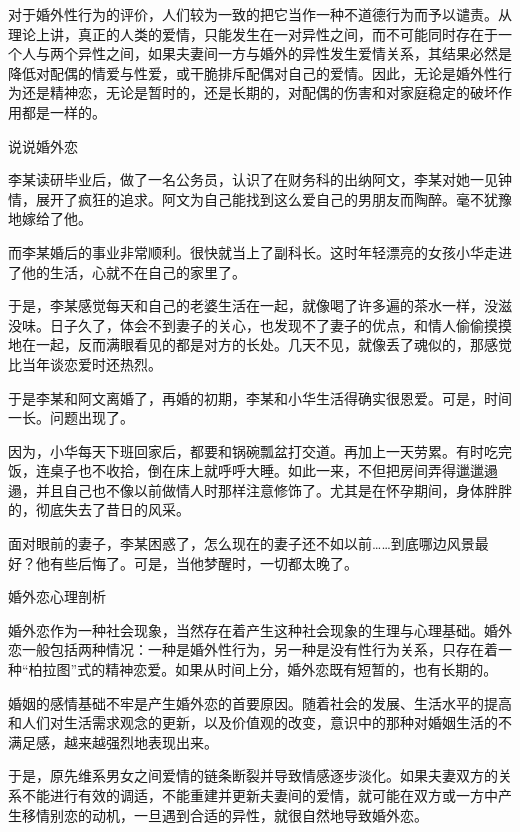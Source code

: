 \documentclass[12pt,UTF8,openany]{ctexbook}
\begin{document}
对于婚外性行为的评价，人们较为一致的把它当作一种不道德行为而予以谴责。从理论上讲，真正的人类的爱情，只能发生在一对异性之间，而不可能同时存在于一个人与两个异性之间，如果夫妻间一方与婚外的异性发生爱情关系，其结果必然是降低对配偶的情爱与性爱，或干脆排斥配偶对自己的爱情。因此，无论是婚外性行为还是精神恋，无论是暂时的，还是长期的，对配偶的伤害和对家庭稳定的破坏作用都是一样的。





说说婚外恋


李某读研毕业后，做了一名公务员，认识了在财务科的出纳阿文，李某对她一见钟情，展开了疯狂的追求。阿文为自己能找到这么爱自己的男朋友而陶醉。毫不犹豫地嫁给了他。

而李某婚后的事业非常顺利。很快就当上了副科长。这时年轻漂亮的女孩小华走进了他的生活，心就不在自己的家里了。

于是，李某感觉每天和自己的老婆生活在一起，就像喝了许多遍的茶水一样，没滋没味。日子久了，体会不到妻子的关心，也发现不了妻子的优点，和情人偷偷摸摸地在一起，反而满眼看见的都是对方的长处。几天不见，就像丢了魂似的，那感觉比当年谈恋爱时还热烈。

于是李某和阿文离婚了，再婚的初期，李某和小华生活得确实很恩爱。可是，时间一长。问题出现了。

因为，小华每天下班回家后，都要和锅碗瓢盆打交道。再加上一天劳累。有时吃完饭，连桌子也不收拾，倒在床上就呼呼大睡。如此一来，不但把房间弄得邋邋遢遢，并且自己也不像以前做情人时那样注意修饰了。尤其是在怀孕期间，身体胖胖的，彻底失去了昔日的风采。

面对眼前的妻子，李某困惑了，怎么现在的妻子还不如以前……到底哪边风景最好？他有些后悔了。可是，当他梦醒时，一切都太晚了。





婚外恋心理剖析


婚外恋作为一种社会现象，当然存在着产生这种社会现象的生理与心理基础。婚外恋一般包括两种情况：一种是婚外性行为，另一种是没有性行为关系，只存在着一种“柏拉图”式的精神恋爱。如果从时间上分，婚外恋既有短暂的，也有长期的。

婚姻的感情基础不牢是产生婚外恋的首要原因。随着社会的发展、生活水平的提高和人们对生活需求观念的更新，以及价值观的改变，意识中的那种对婚姻生活的不满足感，越来越强烈地表现出来。

于是，原先维系男女之间爱情的链条断裂并导致情感逐步淡化。如果夫妻双方的关系不能进行有效的调适，不能重建并更新夫妻间的爱情，就可能在双方或一方中产生移情别恋的动机，一旦遇到合适的异性，就很自然地导致婚外恋。
\end{document}
